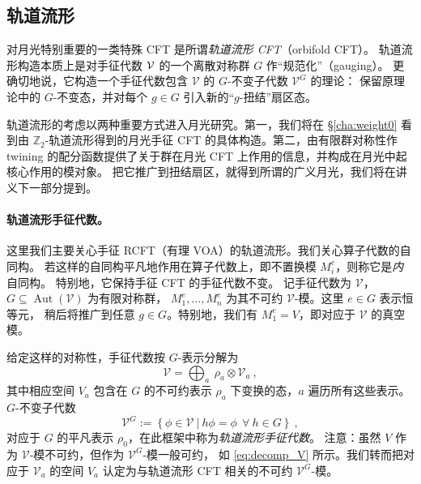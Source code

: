 \documentclass[11pt,a4paper,fontset=windows]{ctexart}
\numberwithin{equation}{section}
\newcommand{\Aut}{\operatorname{\text{Aut}}}      %
\newcommand{\myparagraph}[1]{\paragraph{#1}\mbox\\}
\newcommand{\ZZ}{\mathbb{Z}}
\begin{document}

\subsection{轨道流形}
\label{sec:orbifolds}

对月光特别重要的一类特殊 CFT 是所谓\emph{轨道流形 CFT}（orbifold CFT）\cite{Dijkgraaf:1989hb}。
轨道流形构造本质上是对手征代数 $\cal{V}$ 的一个离散对称群 $G$ 作“规范化”（gauging）。
更确切地说，它构造一个手征代数包含 $\mathcal{V}$ 的 $G$-不变子代数 $\mathcal{V}^G$ 的理论：
保留原理论中的 $G$-不变态，并对每个 $g\in G$ 引入新的“$g$-扭结”扇区态。

轨道流形的考虑以两种重要方式进入月光研究。第一，我们将在 \S\ref{cha:weight0}
看到由 $\ZZ_2$-轨道流形得到的月光手征 CFT 的具体构造。第二，由有限群对称性作 twining
的配分函数提供了关于群在月光 CFT 上作用的信息，并构成在月光中起核心作用的模对象。
把它推广到扭结扇区，就得到所谓的广义月光，我们将在讲义下一部分提到。


\myparagraph{轨道流形手征代数。}
这里我们主要关心手征 RCFT（有理 VOA）的轨道流形。我们关心算子代数的自同构。
若这样的自同构平凡地作用在算子代数上，即不置换模 $M_i^e$，则称它是\emph{内}自同构。
特别地，它保持手征 CFT 的手征代数不变。
记手征代数为 $\mathcal{V}$，$G\subseteq \Aut(\mathcal{V})$ 为有限对称群，
$M^e_1,\dots,M^e_n$ 为其不可约 $\mathcal{V}$-模。这里 $e\in G$ 表示恒等元，
稍后将推广到任意 $g\in G$。特别地，我们有 $M_1^e=V$，即对应于 $\mathcal{V}$ 的真空模。

给定这样的对称性，手征代数按 $G$-表示分解为
\begin{equation}
\label{eq:decomp_V}
\mathcal{V}=\bigoplus_a ~\rho_a \otimes \mathcal{V}_a~,
\end{equation}
其中相应空间 $V_a$ 包含在 $G$ 的不可约表示 $\rho_a$ 下变换的态，$a$ 遍历所有这些表示。
$G$-不变子代数
\begin{equation}
\mathcal{V}^G:=\left\lbrace\phi\in\mathcal{V}~|~h\phi=\phi~~\forall~h\in G\right\rbrace~,
\end{equation}
对应于 $G$ 的平凡表示 $\rho_0$，在此框架中称为\emph{轨道流形手征代数}。
注意：虽然 $V$ 作为 $\mathcal{V}$-模不可约，但作为 $\mathcal{V}^G$-模一般可约，
如 \eqref{eq:decomp_V} 所示。我们转而把对应于 $\mathcal{V}_a$ 的空间 $V_a$
认定为与轨道流形 CFT 相关的不可约 $\mathcal{V}^G$-模。
\end{document}
